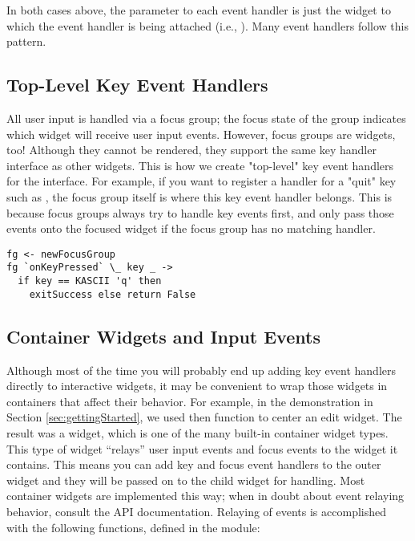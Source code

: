 In both cases above, the  parameter to each event handler is
just the widget to which the event handler is being attached (i.e.,
).  Many event handlers follow this pattern.

\subsection{Top-Level Key Event Handlers}

All user input is handled via a focus group; the focus state of the
group indicates which widget will receive user input events.  However,
focus groups are widgets, too!  Although they cannot be rendered, they
support the same key handler interface as other widgets.  This is how
we create "top-level" key event handlers for the interface.  For
example, if you want to register a handler for a "quit" key such as
, the focus group itself is where this key event handler
belongs.  This is because focus groups always try to handle key events
first, and only pass those events onto the focused widget if the focus
group has no matching handler.

\begin{verbatim}
fg <- newFocusGroup
fg `onKeyPressed` \_ key _ ->
  if key == KASCII 'q' then
    exitSuccess else return False
\end{verbatim}

\subsection{Container Widgets and Input Events}
\label{sec:containers_and_input}

Although most of the time you will probably end up adding key event
handlers directly to interactive widgets, it may be convenient to wrap
those widgets in containers that affect their behavior.  For example,
in the demonstration in Section \ref{sec:gettingStarted}, we used then
 function to center an edit widget.  The result was a
 widget, which is one of the many built-in container
widget types.  This type of widget ``relays'' user input events and
focus events to the widget it contains.  This means you can add key
and focus event handlers to the outer widget and they will be passed
on to the child widget for handling.  Most container widgets are
implemented this way; when in doubt about event relaying behavior,
consult the API documentation.  Relaying of events is accomplished
with the following functions, defined in the  module:

